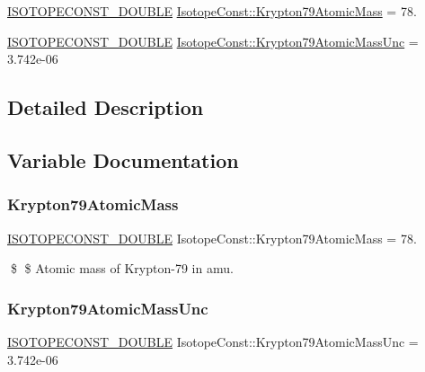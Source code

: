 \begin{DoxyCompactItemize}
\item 
\mbox{\hyperlink{group___isotope_const-_macros_ga8f45a7272ce02c0b4c65c44636ed719a}{I\+S\+O\+T\+O\+P\+E\+C\+O\+N\+S\+T\+\_\+\+D\+O\+U\+B\+LE}} \mbox{\hyperlink{group___isotope_const-_krypton-_kr79_gac43be4092eb17dcd0cf4c62a15940a02}{Isotope\+Const\+::\+Krypton79\+Atomic\+Mass}} = 78.
\item 
\mbox{\hyperlink{group___isotope_const-_macros_ga8f45a7272ce02c0b4c65c44636ed719a}{I\+S\+O\+T\+O\+P\+E\+C\+O\+N\+S\+T\+\_\+\+D\+O\+U\+B\+LE}} \mbox{\hyperlink{group___isotope_const-_krypton-_kr79_ga353217856abddf70c4b60e86fc63d496}{Isotope\+Const\+::\+Krypton79\+Atomic\+Mass\+Unc}} = 3.\+742e-\/06
\end{DoxyCompactItemize}


\subsection{Detailed Description}


\subsection{Variable Documentation}
\mbox{\label{group___isotope_const-_krypton-_kr79_gac43be4092eb17dcd0cf4c62a15940a02}} 
\subsubsection{\texorpdfstring{Krypton79\+Atomic\+Mass}{Krypton79AtomicMass}}
{\footnotesize\ttfamily \mbox{\hyperlink{group___isotope_const-_macros_ga8f45a7272ce02c0b4c65c44636ed719a}{I\+S\+O\+T\+O\+P\+E\+C\+O\+N\+S\+T\+\_\+\+D\+O\+U\+B\+LE}} Isotope\+Const\+::\+Krypton79\+Atomic\+Mass = 78.}

\$ \$ Atomic mass of Krypton-\/79 in amu. \mbox{\label{group___isotope_const-_krypton-_kr79_ga353217856abddf70c4b60e86fc63d496}} 
\subsubsection{\texorpdfstring{Krypton79\+Atomic\+Mass\+Unc}{Krypton79AtomicMassUnc}}
{\footnotesize\ttfamily \mbox{\hyperlink{group___isotope_const-_macros_ga8f45a7272ce02c0b4c65c44636ed719a}{I\+S\+O\+T\+O\+P\+E\+C\+O\+N\+S\+T\+\_\+\+D\+O\+U\+B\+LE}} Isotope\+Const\+::\+Krypton79\+Atomic\+Mass\+Unc = 3.\+742e-\/06}

